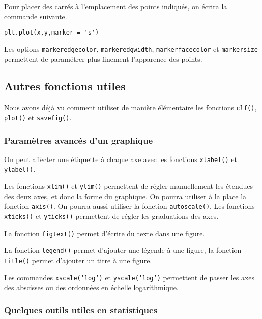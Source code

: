 \begin{exemple}
  Pour placer des carrés à l'emplacement des points indiqués, on écrira la commande suivante.
\begin{lstlisting}
plt.plot(x,y,marker = 's')
\end{lstlisting}
\end{exemple}

\begin{rem}
  Les options \texttt{markeredgecolor}, \texttt{markeredgwidth}, \texttt{markerfacecolor} et \texttt{markersize} permettent de paramétrer plus finement l'apparence des points. 
\end{rem}

\subsection{Autres fonctions utiles}

Nous avons déjà vu comment utiliser de manière élémentaire les fonctions \texttt{clf()}, \texttt{plot()} et \texttt{savefig()}.

\subsubsection{Paramètres avancés d'un graphique}

On peut affecter une étiquette à chaque axe avec les fonctions \texttt{xlabel()} et \texttt{ylabel()}.

Les fonctions \texttt{xlim()} et \texttt{ylim()} permettent de régler manuellement les étendues des deux axes, et donc la forme du graphique. On pourra utiliser à la place la fonction \texttt{axis()}.
On pourra aussi utiliser la fonction \texttt{autoscale()}.
Les fonctions \texttt{xticks()} et \texttt{yticks()} permettent de régler les graduations des axes. 

La fonction \texttt{figtext()} permet d'écrire du texte dans une figure. 

La fonction \texttt{legend()} permet d'ajouter une légende à une figure, la fonction \texttt{title()} permet d'ajouter un titre à une figure. 

Les commandes \texttt{xscale('log')} et \texttt{yscale('log')} permettent de passer les axes des abscisses ou des ordonnées en échelle logarithmique. 

\subsubsection{Quelques outils utiles en statistiques}

